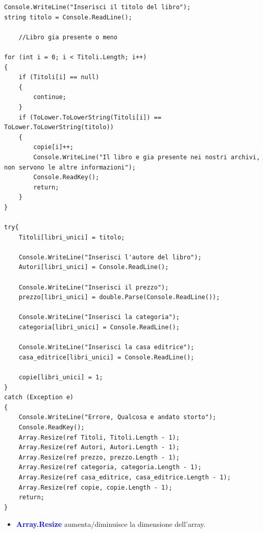 \documentclass[a4paper,12pt]{article}
\begin{document}
\begin{lstlisting}[caption=Inserimento dei dati]
Console.WriteLine("Inserisci il titolo del libro");
string titolo = Console.ReadLine();

    //Libro gia presente o meno

for (int i = 0; i < Titoli.Length; i++)
{
    if (Titoli[i] == null)
    {
        continue;
    }
    if (ToLower.ToLowerString(Titoli[i]) == ToLower.ToLowerString(titolo))
    {
        copie[i]++;
        Console.WriteLine("Il libro e gia presente nei nostri archivi, non servono le altre informazioni");
        Console.ReadKey();
        return;
    }
}

try{
    Titoli[libri_unici] = titolo;

    Console.WriteLine("Inserisci l'autore del libro");
    Autori[libri_unici] = Console.ReadLine();

    Console.WriteLine("Inserisci il prezzo");
    prezzo[libri_unici] = double.Parse(Console.ReadLine());

    Console.WriteLine("Inserisci la categoria");
    categoria[libri_unici] = Console.ReadLine();

    Console.WriteLine("Inserisci la casa editrice");
    casa_editrice[libri_unici] = Console.ReadLine();

    copie[libri_unici] = 1;
}
catch (Exception e)
{
    Console.WriteLine("Errore, Qualcosa e andato storto");
    Console.ReadKey();
    Array.Resize(ref Titoli, Titoli.Length - 1);
    Array.Resize(ref Autori, Autori.Length - 1);
    Array.Resize(ref prezzo, prezzo.Length - 1);
    Array.Resize(ref categoria, categoria.Length - 1);
    Array.Resize(ref casa_editrice, casa_editrice.Length - 1);
    Array.Resize(ref copie, copie.Length - 1);
    return;
}
\end{lstlisting}

\begin{itemize}
    \item \textcolor{blue}{\textbf{Array.Resize}} aumenta/diminuisce la dimensione dell'array.
\end{itemize}

\newpage
\end{document}
